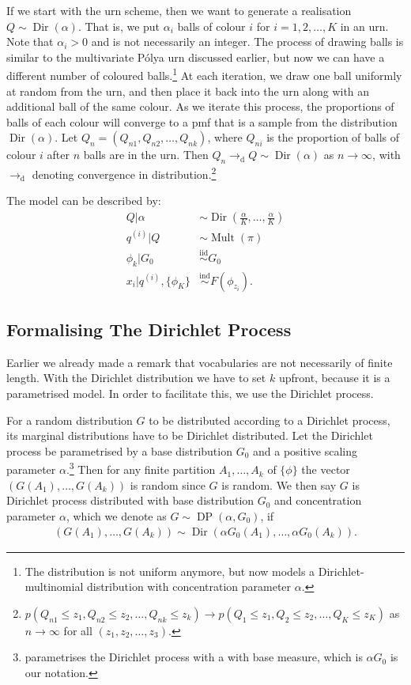 If we start with the urn scheme, then we want to generate a realisation $Q\sim\operatorname{Dir}(\alpha)$. That is, we put $\alpha_i$ balls of colour $i$ for $i=1,2,\ldots,K$ in an urn. Note that $\alpha_i>0$ and is not necessarily an integer. The process of drawing balls is similar to the multivariate P\'olya urn discussed earlier, but now we can have a different number of coloured balls.\footnote{The distribution is not uniform anymore, but now models a Dirichlet-multinomial distribution with concentration parameter $\alpha$.} At each iteration, we draw one ball uniformly at random from the urn, and then place it back into the urn along with an additional ball of the same colour. As we iterate this process, the proportions of balls of each colour will converge to a pmf that is a sample from the distribution $\operatorname{Dir}(\alpha)$. Let $Q_n = (Q_{n1}, Q_{n2},\ldots,Q_{nk})$, where $Q_{ni}$ is the proportion of balls of colour $i$ after $n$ balls are in the urn. Then $Q_n \rightarrow_\text{d} Q \sim \operatorname{Dir}(\alpha)$ as $n\rightarrow\infty$, with $\rightarrow_\text{d}$ denoting convergence in distribution.\footnote{$p(Q_{n1}\leq z_1, Q_{n2}\leq z_2, \ldots, Q_{nk}\leq z_k) \rightarrow p(Q_1\leq z_1, Q_2\leq z_2,\ldots,Q_K\leq z_K)$ as $n\rightarrow\infty$ for all $(z_1,z_2,\ldots,z_3)$.} 

The model can be described by:
\begin{align}
    Q|\alpha &\sim \operatorname{Dir}(\frac{\alpha}{K},\ldots,\frac{\alpha}{K}) \\
    q^{(i)}|Q&\sim\operatorname{Mult}(\pi) \\
    \phi_k | G_0 &\overset{\text{iid}}{\sim} G_0 \\
    x_i|q^{(i)},\{\phi_K\}&\overset{\text{ind}}{\sim} F(\phi_{z_i}).
\end{align}


\subsection{Formalising The Dirichlet Process}
Earlier we already made a remark that vocabularies are not necessarily of finite length. With the Dirichlet distribution we have to set $k$ upfront, because it is a parametrised model. In order to facilitate this, we use the Dirichlet process. 

For a random distribution $G$ to be distributed according to a Dirichlet process, its marginal distributions have to be Dirichlet distributed. Let the Dirichlet process be parametrised by a base distribution $G_0$ and a positive scaling parameter $\alpha$.\footnote{\citet{Ferguson1973A} parametrises the Dirichlet process with a with base measure, which is $\alpha G_0$ is our notation.} Then for any finite partition $A_1,\ldots,A_k$ of $\{\phi\}$ the vector $(G(A_1),\ldots,G(A_k))$ is random since $G$ is random. We then say $G$ is Dirichlet process distributed with base distribution $G_0$ and concentration parameter $\alpha$, which we denote as $G\sim\operatorname{DP}(\alpha, G_0)$, if 
\begin{align}
	(G(A_1),\ldots,G(A_k)) \sim \operatorname{Dir}(\alpha G_0(A_1), \ldots,\alpha G_0(A_k)).
\end{align}

